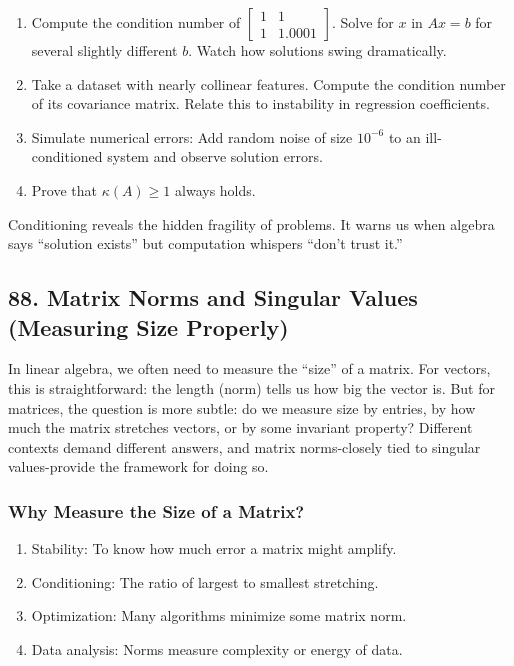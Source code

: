 \documentclass[
  letterpaper,
  DIV=11,
  numbers=noendperiod]{scrreprt}
\providecommand{\tightlist}{%
  \setlength{\itemsep}{0pt}\setlength{\parskip}{0pt}}
\begin{document}
\begin{enumerate}
\def\labelenumi{\arabic{enumi}.}
\tightlist
\item
  Compute the condition number of
  \(\begin{bmatrix}1 & 1 \\ 1 & 1.0001\end{bmatrix}\). Solve for \(x\)
  in \(Ax = b\) for several slightly different \(b\). Watch how
  solutions swing dramatically.
\item
  Take a dataset with nearly collinear features. Compute the condition
  number of its covariance matrix. Relate this to instability in
  regression coefficients.
\item
  Simulate numerical errors: Add random noise of size \(10^{-6}\) to an
  ill-conditioned system and observe solution errors.
\item
  Prove that \(\kappa(A) \geq 1\) always holds.
\end{enumerate}

Conditioning reveals the hidden fragility of problems. It warns us when
algebra says ``solution exists'' but computation whispers ``don't trust
it.''

\subsection{88. Matrix Norms and Singular Values (Measuring Size
Properly)}\label{matrix-norms-and-singular-values-measuring-size-properly}

In linear algebra, we often need to measure the ``size'' of a matrix.
For vectors, this is straightforward: the length (norm) tells us how big
the vector is. But for matrices, the question is more subtle: do we
measure size by entries, by how much the matrix stretches vectors, or by
some invariant property? Different contexts demand different answers,
and matrix norms-closely tied to singular values-provide the framework
for doing so.

\subsubsection{Why Measure the Size of a
Matrix?}\label{why-measure-the-size-of-a-matrix}

\begin{enumerate}
\def\labelenumi{\arabic{enumi}.}
\tightlist
\item
  Stability: To know how much error a matrix might amplify.
\item
  Conditioning: The ratio of largest to smallest stretching.
\item
  Optimization: Many algorithms minimize some matrix norm.
\item
  Data analysis: Norms measure complexity or energy of data.
\end{enumerate}
\end{document}
